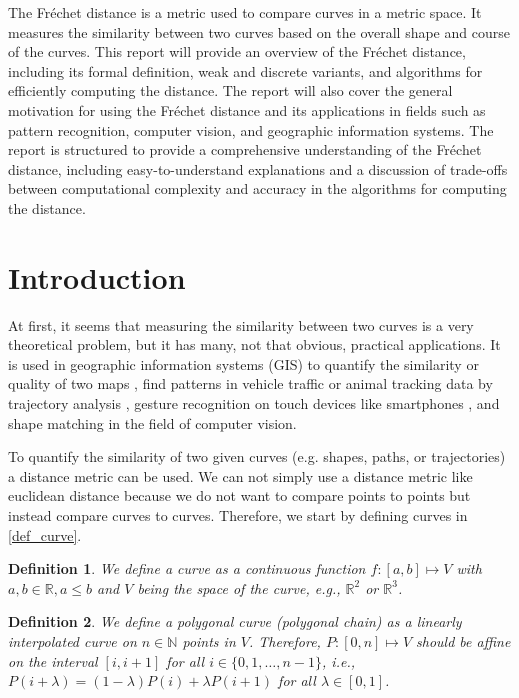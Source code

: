 \documentclass[
oneside,
fontsize=11pt
]{scrartcl}
\newtheorem{mydef}{Definition}
\begin{document}
The Fréchet distance is a metric used to compare curves in a metric space. 
It measures the similarity between two curves based on the overall shape and course of the curves. 
This report will provide an overview of the Fréchet distance, 
including its formal definition, weak and discrete variants, and algorithms for efficiently computing the distance. 
The report will also cover the general motivation for using the Fréchet distance 
and its applications in fields such as pattern recognition, computer vision, and geographic information systems. 
The report is structured to provide a comprehensive understanding of the Fréchet distance, 
including easy-to-understand explanations 
and a discussion of trade-offs between computational complexity and accuracy in the algorithms for computing the distance.


\section{Introduction}
At first, it seems that measuring the similarity between two curves
is a very theoretical problem, but it has many, not that obvious, practical applications.
It is used in geographic information systems (GIS) to 
quantify the similarity or quality of two maps \cite{lyu_partial-frechet-distance-based_2022},
find patterns in vehicle traffic or animal tracking data 
by trajectory analysis \cite{buchin_detecting_2011},
gesture recognition on touch devices like smartphones \cite{hu_research_2022},
and shape matching in the field of computer vision. 

To quantify the similarity of two given curves (e.g. shapes, paths, or trajectories)
a distance metric can be used. 
We can not simply use a distance metric like euclidean distance 
because we do not want to compare points to points 
but instead compare curves to curves. 
Therefore, we start by defining curves in \autoref{def_curve}.

\begin{mydef}
  \label{def_curve}
  We define a curve as a continuous function $f : [a,b] \mapsto V$ 
  with $a,b \in \mathbb{R}, a \leq b$ and $V$ being the space of the curve,
  e.g., $\mathbb{R}^2$ or $\mathbb{R}^3$.
\end{mydef}

\begin{mydef}
  \label{def_polygonal_curve}
  We define a polygonal curve (polygonal chain) 
  as a linearly interpolated curve 
  on $n \in \mathbb{N}$ points in $V$.
  Therefore, $P : [0,n] \mapsto V$ 
  should be affine on the interval $[i,i+1]$ for all $i \in \{0, 1, \dots, n-1\}$, 
  i.e., $P(i + \lambda) = (1 - \lambda)P(i) + \lambda P(i+1)$ for all $\lambda \in [0,1]$.
\end{mydef}
\end{document}
